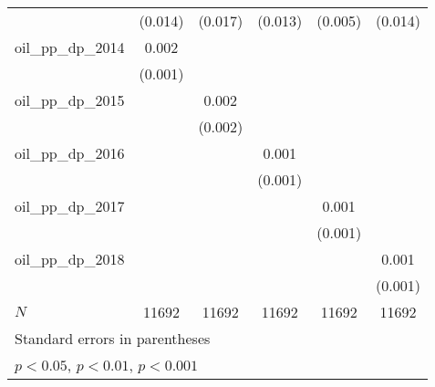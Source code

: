 {\begin{tabular}{l*{5}{c}}
            &     (0.014)         &     (0.017)         &     (0.013)         &     (0.005)         &     (0.014)         \\
[1em]
oil\_pp\_dp\_2014&       0.002         &                     &                     &                     &                     \\
            &     (0.001)         &                     &                     &                     &                     \\
[1em]
oil\_pp\_dp\_2015&                     &       0.002         &                     &                     &                     \\
            &                     &     (0.002)         &                     &                     &                     \\
[1em]
oil\_pp\_dp\_2016&                     &                     &       0.001         &                     &                     \\
            &                     &                     &     (0.001)         &                     &                     \\
[1em]
oil\_pp\_dp\_2017&                     &                     &                     &       0.001         &                     \\
            &                     &                     &                     &     (0.001)         &                     \\
[1em]
oil\_pp\_dp\_2018&                     &                     &                     &                     &       0.001         \\
            &                     &                     &                     &                     &     (0.001)         \\
\hline
\(N\)       &       11692         &       11692         &       11692         &       11692         &       11692         \\
\hline\hline
\multicolumn{6}{l}{\footnotesize Standard errors in parentheses}\\
\multicolumn{6}{l}{\footnotesize \sym{*} \(p<0.05\), \sym{**} \(p<0.01\), \sym{***} \(p<0.001\)}\\
\end{tabular}
}
